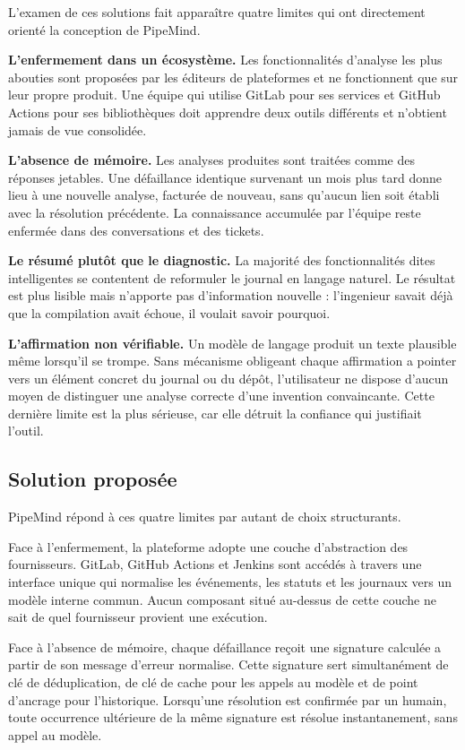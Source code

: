 \documentclass[12pt,a4paper,oneside]{report}
\begin{document}
L'examen de ces solutions fait apparaître quatre limites qui ont directement
orienté la conception de PipeMind.

\textbf{L'enfermement dans un écosystème.} Les fonctionnalités d'analyse les plus
abouties sont proposées par les éditeurs de plateformes et ne fonctionnent que
sur leur propre produit. Une équipe qui utilise GitLab pour ses services et
GitHub Actions pour ses bibliothèques doit apprendre deux outils différents et
n'obtient jamais de vue consolidée.

\textbf{L'absence de mémoire.} Les analyses produites sont traitées comme des
réponses jetables. Une défaillance identique survenant un mois plus tard donne
lieu à une nouvelle analyse, facturée de nouveau, sans qu'aucun lien soit établi
avec la résolution précédente. La connaissance accumulée par l'équipe reste
enfermée dans des conversations et des tickets.

\textbf{Le résumé plutôt que le diagnostic.} La majorité des fonctionnalités
dites intelligentes se contentent de reformuler le journal en langage naturel.
Le résultat est plus lisible mais n'apporte pas d'information nouvelle :
l'ingenieur savait déjà que la compilation avait échoue, il voulait savoir
pourquoi.

\textbf{L'affirmation non vérifiable.} Un modèle de langage produit un texte
plausible même lorsqu'il se trompe. Sans mécanisme obligeant chaque affirmation a
pointer vers un élément concret du journal ou du dépôt, l'utilisateur ne dispose
d'aucun moyen de distinguer une analyse correcte d'une invention convaincante.
Cette dernière limite est la plus sérieuse, car elle détruit la confiance qui
justifiait l'outil.

\subsection{Solution proposée}

PipeMind répond à ces quatre limites par autant de choix structurants.

Face à l'enfermement, la plateforme adopte une couche d'abstraction des
fournisseurs. GitLab, GitHub Actions et Jenkins sont accédés à travers une
interface unique qui normalise les événements, les statuts et les journaux vers
un modèle interne commun. Aucun composant situé au-dessus de cette couche ne sait
de quel fournisseur provient une exécution.

Face à l'absence de mémoire, chaque défaillance reçoit une signature calculée a
partir de son message d'erreur normalise. Cette signature sert simultanément de
clé de déduplication, de clé de cache pour les appels au modèle et de point
d'ancrage pour l'historique. Lorsqu'une résolution est confirmée par un humain,
toute occurrence ultérieure de la même signature est résolue instantanement, sans
appel au modèle.
\end{document}
